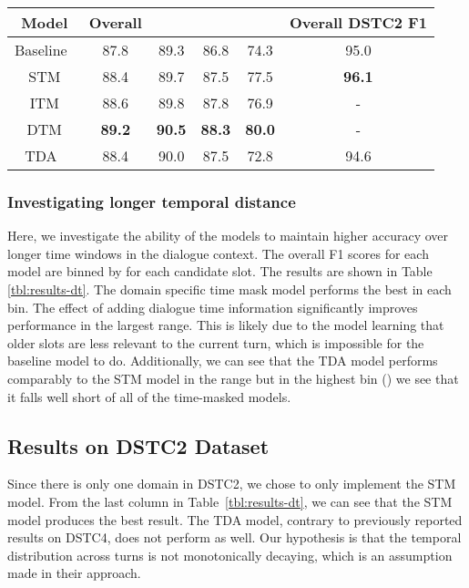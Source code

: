 \documentclass[11pt,a4paper]{article}
\begin{document}
\begin{table*}[ht]
\small
\begin{center}
\begin{tabular}{|c||c|c|c|c||c|} \hline
Model & Overall &  &  &  & Overall DSTC2 F1 \\\hline
Baseline~\citep{cc-inter} & 87.8 & 89.3 & 86.8 & 74.3 & 95.0\\
STM & 88.4 & 89.7 & 87.5 & 77.5 & \textbf{96.1} \\
ITM & 88.6 & 89.8 & 87.8 & 76.9 & - \\
DTM & \textbf{89.2} & \textbf{90.5} & \textbf{88.3} & \textbf{80.0} & - \\\hline
TDA~\cite{su2018time}   & 88.4 & 90.0 & 87.5 & 72.8 & 94.6 \\\hline
\end{tabular}
\end{center}
\caption{
Overall F1 scores on the IPDA and DSTC2 dataset as well as F1 scores binned by  for the IPDA dataset, which is measured in seconds. Note: the DSTC2 dataset only contains a single domain 
}
\label{tbl:results-dt}
\end{table*}

\subsubsection{Investigating longer temporal distance}
\label{sssec:large-t}

Here, we investigate the ability of the models to maintain higher accuracy over longer time windows in the dialogue context.
The overall F1 scores for each model are binned by  for each candidate slot.
The results are shown in Table \ref{tbl:results-dt}.
The domain specific time mask model performs the best in each  bin.
The effect of adding dialogue time information significantly improves performance in the largest  range.
This is likely due to the model learning that older slots are less relevant to the current turn, which is impossible for the baseline model to do.
Additionally, we can see that the TDA model performs comparably to the STM model in the range  but in the highest bin () we see that it falls well short of all of the time-masked models.

\subsection{Results on DSTC2 Dataset}

Since there is only one domain in DSTC2, we chose to only implement the STM model.
From the last column in Table~\ref{tbl:results-dt}, we can see that the STM model produces the best result.
The TDA model, contrary to previously reported results on DSTC4, does not perform as well.
Our hypothesis is that the temporal distribution across turns is not monotonically decaying, which is an assumption made in their approach.
 
\end{document}
